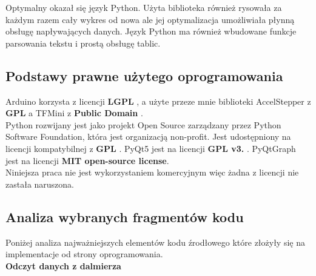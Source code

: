 Optymalny okazał się język Python. Użyta biblioteka również rysowała za każdym razem cały wykres od nowa ale jej optymalizacja umożliwiała płynną obsługę napływających danych. Język Python ma również wbudowane funkcje parsowania tekstu i prostą obsługę tablic.

\subsection {Podstawy prawne użytego oprogramowania}
Arduino korzysta z licencji \textbf{LGPL} \cite{arduino_lic}, a użyte przeze mnie biblioteki
AccelStepper z \textbf{GPL} \cite{accelstepper_lic} a TFMini z \textbf{Public Domain} \cite{tfmini_lic}.\\

Python rozwijany jest jako projekt Open Source zarządzany przez Python Software Foundation, która jest organizacją non-profit. Jest udostępniony na licencji kompatybilnej z \textbf{GPL} \cite{python_lic}. PyQt5 jest na licencji \textbf{GPL v3.} \cite{pyqt5_lic}. PyQtGraph jest na licencji \textbf{MIT open-source license}. \cite{pyqtgraph_lic}\\

Niniejsza praca nie jest wykorzystaniem komercyjnym więc żadna z licencji nie zastała naruszona.

\subsection {Analiza wybranych fragmentów kodu}

Poniżej analiza najważniejszych elementów kodu źrodłowego które złożyły się na implementacje od strony oprogramowania.\\

\textbf{Odczyt danych z dalmierza}

